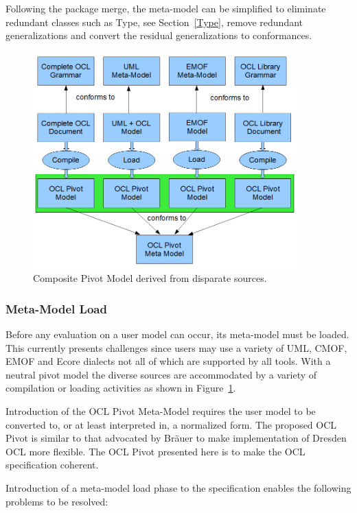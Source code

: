 \documentclass{eceasst}
\begin{document}
Following the package merge, the meta-model can be simplified to eliminate redundant classes such as Type, see Section~\ref{Type}, remove redundant generalizations and convert the residual generalizations to conformances.

\begin{figure}
  \begin{center}
    \includegraphics[width=4.0in]{Load.png}
  \end{center}
  \caption{Composite Pivot Model derived from disparate sources.}
  \label{fig:Load}
\end{figure}

\subsubsection{Meta-Model Load}

Before any evaluation on a user model can occur, its meta-model must be loaded. This currently presents challenges since users may use a variety of UML, CMOF, EMOF and Ecore dialects not all of which are supported by all tools. With a neutral pivot model the diverse sources are accommodated by a variety of compilation or loading activities as shown in Figure~\ref{fig:Load}.

Introduction of the OCL Pivot Meta-Model requires the user model to be converted to, or at least interpreted in, a normalized form. The proposed OCL Pivot is similar to that advocated by Br\"{a}uer\cite{Pivot} to make implementation of Dresden OCL more flexible. The OCL Pivot presented here is to make the OCL specification coherent.

Introduction of a meta-model load phase to the specification enables the following problems to be resolved:
\end{document}

